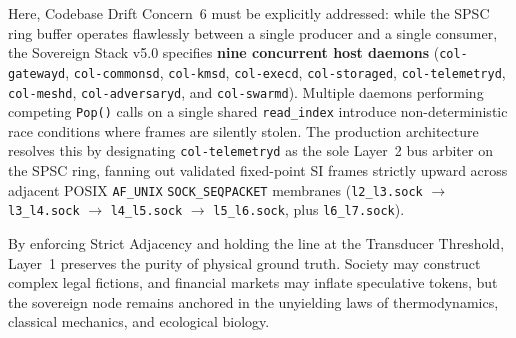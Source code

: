 Here, Codebase Drift Concern~6 must be explicitly addressed: while the SPSC ring buffer operates flawlessly between a single producer and a single consumer, the Sovereign Stack v5.0 specifies \textbf{nine concurrent host daemons} (\texttt{col-gatewayd}, \texttt{col-commonsd}, \texttt{col-kmsd}, \texttt{col-execd}, \texttt{col-storaged}, \texttt{col-telemetryd}, \texttt{col-meshd}, \texttt{col-adversaryd}, and \texttt{col-swarmd}). Multiple daemons performing competing \texttt{Pop()} calls on a single shared \texttt{read\_index} introduce non-deterministic race conditions where frames are silently stolen. The production architecture resolves this by designating \texttt{col-telemetryd} as the sole Layer~2 bus arbiter on the SPSC ring, fanning out validated fixed-point SI frames strictly upward across adjacent POSIX \texttt{AF\_UNIX} \texttt{SOCK\_SEQPACKET} membranes (\texttt{l2\_l3.sock} $\to$ \texttt{l3\_l4.sock} $\to$ \texttt{l4\_l5.sock} $\to$ \texttt{l5\_l6.sock}, plus \texttt{l6\_l7.sock}).

By enforcing Strict Adjacency and holding the line at the Transducer Threshold, Layer~1 preserves the purity of physical ground truth. Society may construct complex legal fictions, and financial markets may inflate speculative tokens, but the sovereign node remains anchored in the unyielding laws of thermodynamics, classical mechanics, and ecological biology.
